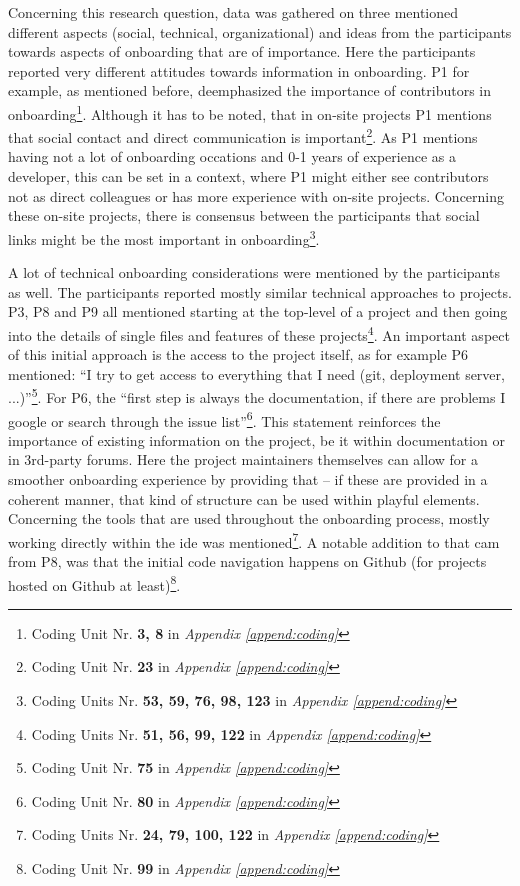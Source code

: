 Concerning this research question, data was gathered on three mentioned different aspects (social, technical, organizational) and ideas from the participants towards aspects of onboarding that are of importance. Here the participants reported very different attitudes towards information in onboarding. P1 for example, as mentioned before, deemphasized the importance of contributors in onboarding\footnote{Coding Unit Nr. \textbf{3, 8} in \textit{Appendix \ref{append:coding}}}. Although it has to be noted, that in on-site projects P1 mentions that social contact and direct communication is important\footnote{Coding Unit Nr. \textbf{23} in \textit{Appendix \ref{append:coding}}}. As P1 mentions having not a lot of onboarding occations and 0-1 years of experience as a developer, this can be set in a context, where P1 might either see contributors not as direct colleagues or has more experience with on-site projects. Concerning these on-site projects, there is consensus between the participants that social links might be the most important in onboarding\footnote{Coding Units Nr. \textbf{53, 59, 76, 98, 123} in \textit{Appendix \ref{append:coding}}}.

A lot of technical onboarding considerations were mentioned by the participants as well. The participants reported mostly similar technical approaches to projects. P3, P8 and P9 all mentioned starting at the top-level of a project and then going into the details of single files and features of these projects\footnote{Coding Units Nr. \textbf{51, 56, 99, 122} in \textit{Appendix \ref{append:coding}}}. An important aspect of this initial approach is the access to the project itself, as for example P6 mentioned: \enquote{I try to get access to everything that I need (git, deployment server, ...)}\footnote{Coding Unit Nr. \textbf{75} in \textit{Appendix \ref{append:coding}}}. For P6, the \enquote{first step is always the documentation, if there are problems I google or search through the issue list}\footnote{Coding Unit Nr. \textbf{80} in \textit{Appendix \ref{append:coding}}}. This statement reinforces the importance of existing information on the project, be it within documentation or in 3rd-party forums. Here the project maintainers themselves can allow for a smoother onboarding experience by providing that -- if these are provided in a coherent manner, that kind of structure can be used within playful elements. Concerning the tools that are used throughout the onboarding process, mostly working directly within the \gls{ide} was mentioned\footnote{Coding Units Nr. \textbf{24, 79, 100, 122} in \textit{Appendix \ref{append:coding}}}. A notable addition to that cam from P8, was that the initial code navigation happens on Github (for projects hosted on Github at least)\footnote{Coding Unit Nr. \textbf{99} in \textit{Appendix \ref{append:coding}}}.

